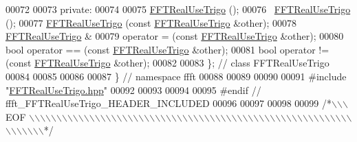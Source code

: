 \begin{DoxyCode}
00072 
00073 \textcolor{keyword}{private}:
00074 
00075                         \hyperlink{a00016}{FFTRealUseTrigo} ();
00076                         ~\hyperlink{a00016}{FFTRealUseTrigo} ();
00077                         \hyperlink{a00016}{FFTRealUseTrigo} (\textcolor{keyword}{const} \hyperlink{a00016}{FFTRealUseTrigo} &other);
00078     \hyperlink{a00016}{FFTRealUseTrigo} &
00079                         operator = (\textcolor{keyword}{const} \hyperlink{a00016}{FFTRealUseTrigo} &other);
00080     \textcolor{keywordtype}{bool}                operator == (\textcolor{keyword}{const} \hyperlink{a00016}{FFTRealUseTrigo} &other);
00081     \textcolor{keywordtype}{bool}                operator != (\textcolor{keyword}{const} \hyperlink{a00016}{FFTRealUseTrigo} &other);
00082 
00083 \};  \textcolor{comment}{// class FFTRealUseTrigo}
00084 
00085 
00086 
00087 \}   \textcolor{comment}{// namespace ffft}
00088 
00089 
00090 
00091 \textcolor{preprocessor}{#include    "\hyperlink{a00107}{FFTRealUseTrigo.hpp}"}
00092 
00093 
00094 
00095 \textcolor{preprocessor}{#endif  // ffft\_FFTRealUseTrigo\_HEADER\_INCLUDED}
00096 
00097 
00098 
00099 \textcolor{comment}{/*\(\backslash\)\(\backslash\)\(\backslash\) EOF \(\backslash\)\(\backslash\)\(\backslash\)\(\backslash\)\(\backslash\)\(\backslash\)\(\backslash\)\(\backslash\)\(\backslash\)\(\backslash\)\(\backslash\)\(\backslash\)\(\backslash\)\(\backslash\)\(\backslash\)\(\backslash\)\(\backslash\)\(\backslash\)\(\backslash\)\(\backslash\)\(\backslash\)\(\backslash\)\(\backslash\)\(\backslash\)\(\backslash\)\(\backslash\)\(\backslash\)\(\backslash\)\(\backslash\)\(\backslash\)\(\backslash\)\(\backslash\)\(\backslash\)\(\backslash\)\(\backslash\)\(\backslash\)\(\backslash\)\(\backslash\)\(\backslash\)\(\backslash\)\(\backslash\)\(\backslash\)\(\backslash\)\(\backslash\)\(\backslash\)\(\backslash\)\(\backslash\)\(\backslash\)\(\backslash\)\(\backslash\)\(\backslash\)\(\backslash\)\(\backslash\)\(\backslash\)\(\backslash\)\(\backslash\)\(\backslash\)\(\backslash\)\(\backslash\)\(\backslash\)\(\backslash\)\(\backslash\)\(\backslash\)\(\backslash\)\(\backslash\)\(\backslash\)*/}
\end{DoxyCode}
